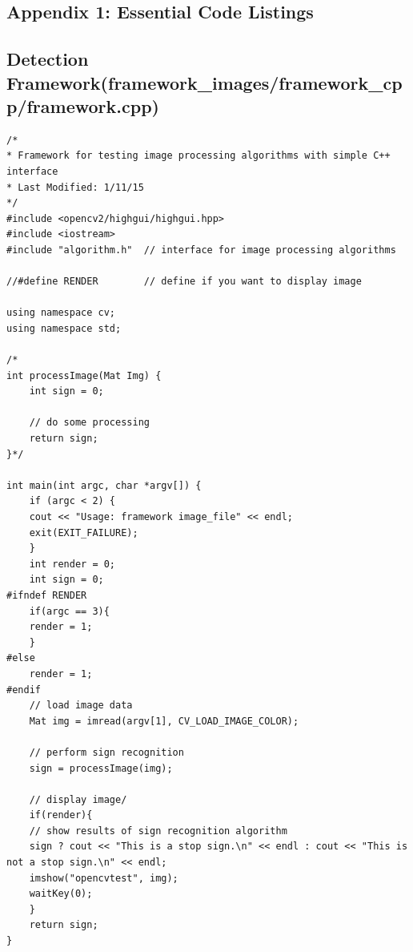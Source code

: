 \documentclass[letterpaper,10pt,titlepage]{article}
\begin{document}
\newpage

\vspace*{\fill}
\begin{center}
\begin{minipage}{0.6\textwidth}
\section*{Appendix 1: Essential Code Listings}
\end{minipage}
\end{center}
\vfill

\newpage
\subsection*{Detection Framework(framework\_images/framework\_cpp/framework.cpp)}
\begin{lstlisting}
/*
* Framework for testing image processing algorithms with simple C++ interface
* Last Modified: 1/11/15
*/
#include <opencv2/highgui/highgui.hpp>
#include <iostream>
#include "algorithm.h"	// interface for image processing algorithms

//#define RENDER		// define if you want to display image

using namespace cv;
using namespace std;

/*
int processImage(Mat Img) {
	int sign = 0;

	// do some processing
	return sign;
}*/

int main(int argc, char *argv[]) {
    if (argc < 2) {
	cout << "Usage: framework image_file" << endl;
	exit(EXIT_FAILURE);
    }
    int render = 0;
    int sign = 0;
#ifndef RENDER
    if(argc == 3){
	render = 1;
    }
#else
    render = 1;
#endif
    // load image data  
    Mat img = imread(argv[1], CV_LOAD_IMAGE_COLOR);

    // perform sign recognition
    sign = processImage(img);
    
    // display image/
    if(render){
	// show results of sign recognition algorithm
	sign ? cout << "This is a stop sign.\n" << endl : cout << "This is not a stop sign.\n" << endl;
	imshow("opencvtest", img);
	waitKey(0);
    }
    return sign;
}

\end{lstlisting}
\end{document}
